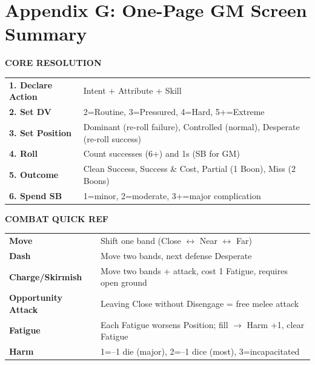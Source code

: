 \clearpage
\section*{Appendix G: One-Page GM Screen Summary}
\label{app:gm-screen}

\begin{tcolorbox}[title=\textbf{Fate's Edge -- GM Screen}, colback=blue!5!white, colframe=blue!75!black, sharp corners, fonttitle=\bfseries, center title,breakable]
\begin{center}
\large\textbf{CORE RESOLUTION}
\end{center}
\begin{tabularx}{\textwidth}{X|X}
\hline
\textbf{1. Declare Action} & Intent + Attribute + Skill \\
\textbf{2. Set DV} & 2=Routine, 3=Pressured, 4=Hard, 5+=Extreme \\
\textbf{3. Set Position} & Dominant (re-roll failure), Controlled (normal), Desperate (re-roll success) \\
\textbf{4. Roll} & Count successes (6+) and 1s (SB for GM) \\
\textbf{5. Outcome} & Clean Success, Success \& Cost, Partial (1 Boon), Miss (2 Boons) \\
\textbf{6. Spend SB} & 1=minor, 2=moderate, 3+=major complication \\
\hline
\end{tabularx}

\vspace{0.5em}
\begin{center}
\large\textbf{COMBAT QUICK REF}
\end{center}
\begin{tabularx}{\textwidth}{X|X}
\hline
\textbf{Move} & Shift one band (Close \(\leftrightarrow\) Near \(\leftrightarrow\) Far) \\
\textbf{Dash} & Move two bands, next defense Desperate \\
\textbf{Charge/Skirmish} & Move two bands + attack, cost 1 Fatigue, requires open ground \\
\textbf{Opportunity Attack} & Leaving Close without Disengage = free melee attack \\
\textbf{Fatigue} & Each Fatigue worsens Position; fill \(\rightarrow\) Harm +1, clear Fatigue \\
\textbf{Harm} & 1=--1 die (major), 2=--1 dice (most), 3=incapacitated \\
\hline
\end{tabularx}


\end{tcolorbox}

